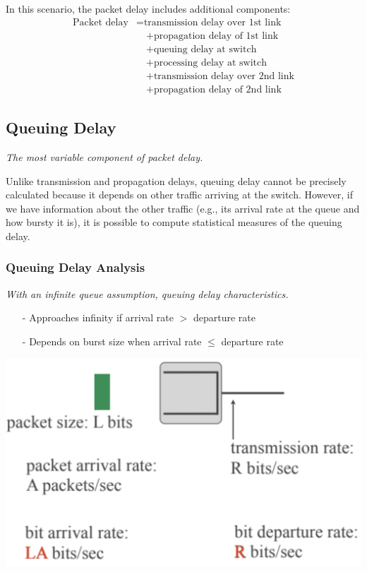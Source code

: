 \documentclass[../../compsys.tex]{subfiles}
\begin{document}
In this scenario, the packet delay includes additional components:
\begin{align}
\text{Packet delay} &= \text{transmission delay over 1st link} \\
&\quad + \text{propagation delay of 1st link} \\
&\quad + \text{queuing delay at switch} \\
&\quad + \text{processing delay at switch} \\
&\quad + \text{transmission delay over 2nd link} \\
&\quad + \text{propagation delay of 2nd link}
\end{align}

\subsection{Queuing Delay}
\textit{The most variable component of packet delay.}

Unlike transmission and propagation delays, queuing delay cannot be precisely calculated because it depends on other traffic arriving at the switch. However, if we have information about the other traffic (e.g., its arrival rate at the queue and how bursty it is), it is possible to compute statistical measures of the queuing delay.

\subsubsection{Queuing Delay Analysis}
\textit{With an infinite queue assumption, queuing delay characteristics.}

\begin{itemize}
  \item[-] Approaches infinity if arrival rate $> $ departure rate
  \item[-] Depends on burst size when arrival rate $\le $ departure rate
\end{itemize}

\begin{center}
  \includegraphics[width=.55\textwidth]{images/queuing_delay.png}
\end{center}
\end{document}

